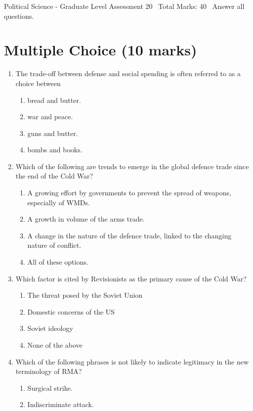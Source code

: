 \documentclass[12pt]{article}
\begin{document}
\begin{center}
Political Science - Graduate Level Assessment 20 \
Total Marks: 40 \
Answer all questions.
\end{center}

\section*{Multiple Choice (10 marks)}
\begin{enumerate}[label=\arabic*.]
\item The trade-off between defense and social spending is often referred to as a choice between
\begin{enumerate}[label=(\alph*)]
    \item bread and butter.
    \item war and peace.
    \item guns and butter.
    \item bombs and books.
\end{enumerate}
\item Which of the following are trends to emerge in the global defence trade since the end of the Cold War?
\begin{enumerate}[label=(\alph*)]
    \item A growing effort by governments to prevent the spread of weapons, especially of WMDs.
    \item A growth in volume of the arms trade.
    \item A change in the nature of the defence trade, linked to the changing nature of conflict.
    \item All of these options.
\end{enumerate}
\item Which factor is cited by Revisionists as the primary cause of the Cold War?
\begin{enumerate}[label=(\alph*)]
    \item The threat posed by the Soviet Union
    \item Domestic concerns of the US
    \item Soviet ideology
    \item None of the above
\end{enumerate}
\item Which of the following phrases is not likely to indicate legitimacy in the new terminology of RMA?
\begin{enumerate}[label=(\alph*)]
    \item Surgical strike.
    \item Indiscriminate attack.

\end{enumerate}
\end{enumerate}
\end{document}

